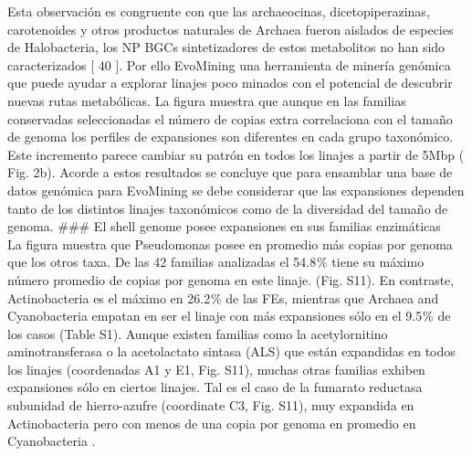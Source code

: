 \documentclass[12pt,twoside]{reedthesis}
\begin{document}
  Esta observación es congruente con que las archaeocinas,
  dicetopiperazinas, carotenoides y otros productos naturales de Archaea
  fueron aislados de especies de Halobacteria, los NP BGCs sintetizadores
  de estos metabolitos no han sido caracterizados {[} 40 {]}. Por ello
  EvoMining una herramienta de minería genómica que puede ayudar a
  explorar linajes poco minados con el potencial de descubrir nuevas rutas
  metabólicas. La figura muestra que aunque en las familias conservadas
  seleccionadas el número de copias extra correlaciona con el tamaño de
  genoma los perfiles de expansiones son diferentes en cada grupo
  taxonómico. Este incremento parece cambiar su patrón en todos los
  linajes a partir de 5Mbp ( Fig. 2b). Acorde a estos resultados se
  concluye que para ensamblar una base de datos genómica para EvoMining se
  debe considerar que las expansiones dependen tanto de los distintos
  linajes taxonómicos como de la diversidad del tamaño de genoma. \#\#\#
  El shell genome posee expansiones en sus familias enzimáticas\\
  La figura muestra que Pseudomonas posee en promedio más copias por
  genoma que los otros taxa. De las 42 familias analizadas el 54.8 \%
  tiene su máximo número promedio de copias por genoma en este linaje.
  (Fig. S11). En contraste, Actinobacteria es el máximo en 26.2 \% de las
  FEs, mientras que Archaea and Cyanobacteria empatan en ser el linaje con
  más expansiones sólo en el 9.5 \% de los casos (Table S1). Aunque
  existen familias como la acetylornitino aminotransferasa o la
  acetolactato sintasa (ALS) que están expandidas en todos los linajes
  (coordenadas A1 y E1, Fig. S11), muchas otras familias exhiben
  expansiones sólo en ciertos linajes. Tal es el caso de la fumarato
  reductasa subunidad de hierro-azufre (coordinate C3, Fig. S11), muy
  expandida en Actinobacteria pero con menos de una copia por genoma en
  promedio en Cyanobacteria .
  
\end{document}
